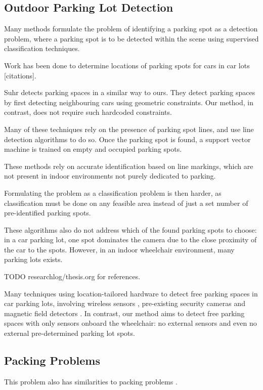 \subsection{Outdoor Parking Lot Detection}

Many methods formulate the problem of identifying a parking spot
as a detection problem, where a parking spot is to be detected within the scene
using supervised classification techniques.

Work has been done to determine locations of parking spots for cars in car lots
[citations]. 
\cite{wu2006parking, true2007vacant}

Suhr \cite{suhr2010automatic} detects parking spaces in a similar way to ours.
They detect parking spaces by first detecting neighbouring cars using geometric
constraints. Our method, in contrast, does not require such hardcoded
constraints.


Many of these techniques rely on the presence of parking spot
lines, and use line detection algorithms to do so. Once the parking spot is
found, a support vector machine is trained on empty and occupied parking spots.

These methods rely on accurate identification based on line markings, which are
not present in indoor environments not purely dedicated to parking. 

Formulating the problem as a classification problem is then harder, as
classification must be done on any feasible area instead of just a set number of
pre-identified parking spots.

These algorithms also do not address which of the found parking spots to choose:
in a car parking lot, one spot dominates the camera due to the close proximity
of the car to the spots. However, in an indoor wheelchair environment, many
parking lots exists.

TODO researchlog/thesis.org for references.

Many techniques using location-tailored hardware to detect free parking spaces
in car parking lots, involving wireless sensors \cite{panja2011wirelessly},
pre-existing security cameras \cite{true2007vacant} and magnetic field detectors
\cite{boda2007design}. In contrast, our method aims to detect free parking
spaces with only sensors onboard the wheelchair: no external sensors and even no
external pre-determined parking lot spots.


\subsection{Packing Problems}
This problem also has similarities to packing problems \cite{dyckhoff1990typology}.

